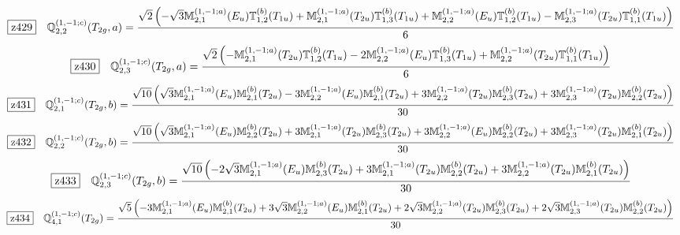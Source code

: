 \documentclass[fleqn,10pt,landscape]{jsarticle}
\begin{document}
\begin{dmath*}
\hspace*{3mm}\fbox{z429}\quad \mathbb{Q}_{2,2}^{(1,-1;c)}(T_{2g},a)=\frac{\sqrt{2} \left(- \sqrt{3} \mathbb{M}_{2,1}^{(1,-1;a)}(E_{u}) \mathbb{T}_{1,2}^{(b)}(T_{1u}) + \mathbb{M}_{2,1}^{(1,-1;a)}(T_{2u}) \mathbb{T}_{1,3}^{(b)}(T_{1u}) + \mathbb{M}_{2,2}^{(1,-1;a)}(E_{u}) \mathbb{T}_{1,2}^{(b)}(T_{1u}) - \mathbb{M}_{2,3}^{(1,-1;a)}(T_{2u}) \mathbb{T}_{1,1}^{(b)}(T_{1u})\right)}{6}
\end{dmath*}
\begin{dmath*}
\hspace*{3mm}\fbox{z430}\quad \mathbb{Q}_{2,3}^{(1,-1;c)}(T_{2g},a)=\frac{\sqrt{2} \left(- \mathbb{M}_{2,1}^{(1,-1;a)}(T_{2u}) \mathbb{T}_{1,2}^{(b)}(T_{1u}) - 2 \mathbb{M}_{2,2}^{(1,-1;a)}(E_{u}) \mathbb{T}_{1,3}^{(b)}(T_{1u}) + \mathbb{M}_{2,2}^{(1,-1;a)}(T_{2u}) \mathbb{T}_{1,1}^{(b)}(T_{1u})\right)}{6}
\end{dmath*}
\begin{dmath*}
\hspace*{3mm}\fbox{z431}\quad \mathbb{Q}_{2,1}^{(1,-1;c)}(T_{2g},b)=\frac{\sqrt{10} \left(\sqrt{3} \mathbb{M}_{2,1}^{(1,-1;a)}(E_{u}) \mathbb{M}_{2,1}^{(b)}(T_{2u}) - 3 \mathbb{M}_{2,2}^{(1,-1;a)}(E_{u}) \mathbb{M}_{2,1}^{(b)}(T_{2u}) + 3 \mathbb{M}_{2,2}^{(1,-1;a)}(T_{2u}) \mathbb{M}_{2,3}^{(b)}(T_{2u}) + 3 \mathbb{M}_{2,3}^{(1,-1;a)}(T_{2u}) \mathbb{M}_{2,2}^{(b)}(T_{2u})\right)}{30}
\end{dmath*}
\begin{dmath*}
\hspace*{3mm}\fbox{z432}\quad \mathbb{Q}_{2,2}^{(1,-1;c)}(T_{2g},b)=\frac{\sqrt{10} \left(\sqrt{3} \mathbb{M}_{2,1}^{(1,-1;a)}(E_{u}) \mathbb{M}_{2,2}^{(b)}(T_{2u}) + 3 \mathbb{M}_{2,1}^{(1,-1;a)}(T_{2u}) \mathbb{M}_{2,3}^{(b)}(T_{2u}) + 3 \mathbb{M}_{2,2}^{(1,-1;a)}(E_{u}) \mathbb{M}_{2,2}^{(b)}(T_{2u}) + 3 \mathbb{M}_{2,3}^{(1,-1;a)}(T_{2u}) \mathbb{M}_{2,1}^{(b)}(T_{2u})\right)}{30}
\end{dmath*}
\begin{dmath*}
\hspace*{3mm}\fbox{z433}\quad \mathbb{Q}_{2,3}^{(1,-1;c)}(T_{2g},b)=\frac{\sqrt{10} \left(- 2 \sqrt{3} \mathbb{M}_{2,1}^{(1,-1;a)}(E_{u}) \mathbb{M}_{2,3}^{(b)}(T_{2u}) + 3 \mathbb{M}_{2,1}^{(1,-1;a)}(T_{2u}) \mathbb{M}_{2,2}^{(b)}(T_{2u}) + 3 \mathbb{M}_{2,2}^{(1,-1;a)}(T_{2u}) \mathbb{M}_{2,1}^{(b)}(T_{2u})\right)}{30}
\end{dmath*}
\begin{dmath*}
\hspace*{3mm}\fbox{z434}\quad \mathbb{Q}_{4,1}^{(1,-1;c)}(T_{2g})=\frac{\sqrt{5} \left(- 3 \mathbb{M}_{2,1}^{(1,-1;a)}(E_{u}) \mathbb{M}_{2,1}^{(b)}(T_{2u}) + 3 \sqrt{3} \mathbb{M}_{2,2}^{(1,-1;a)}(E_{u}) \mathbb{M}_{2,1}^{(b)}(T_{2u}) + 2 \sqrt{3} \mathbb{M}_{2,2}^{(1,-1;a)}(T_{2u}) \mathbb{M}_{2,3}^{(b)}(T_{2u}) + 2 \sqrt{3} \mathbb{M}_{2,3}^{(1,-1;a)}(T_{2u}) \mathbb{M}_{2,2}^{(b)}(T_{2u})\right)}{30}
\end{dmath*}
\end{document}
